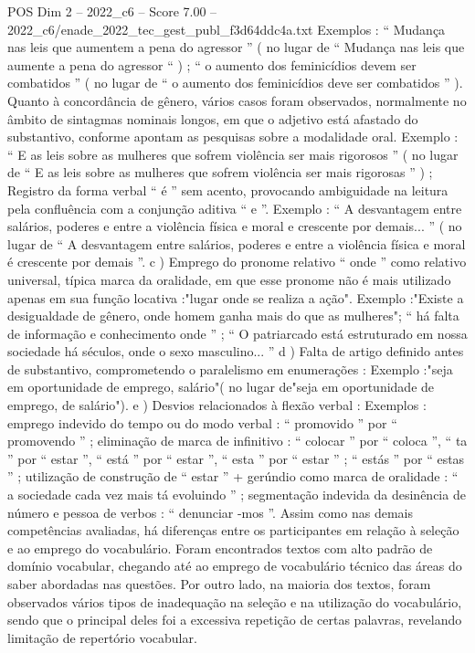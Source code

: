 \begin{textsample}{POS Dim 2 – 2022\_c6 – Score 7.00 – 2022\_c6/enade\_2022\_tec\_gest\_publ\_f3d64ddc4a.txt}
Exemplos : “ Mudança nas leis que aumentem a pena do agressor ” ( no lugar de “ Mudança nas leis que aumente a pena do agressor “ ) ; “ o aumento dos feminicídios devem ser combatidos ” ( no lugar de “ o aumento dos feminicídios deve ser combatidos ” ).
Quanto à concordância de gênero, vários casos foram observados, normalmente no âmbito de sintagmas nominais longos, em que o adjetivo está afastado do substantivo, conforme apontam as pesquisas sobre a modalidade oral.
Exemplo : “ E as leis sobre as mulheres que sofrem violência ser mais rigorosos ” ( no lugar de “ E as leis sobre as mulheres que sofrem violência ser mais rigorosas ” ) ; Registro da forma verbal “ é ” sem acento, provocando ambiguidade na leitura pela confluência com a conjunção aditiva “ e ”.
Exemplo : “ A desvantagem entre salários, poderes e entre a violência física e moral e crescente por demais... ” ( no lugar de “ A desvantagem entre salários, poderes e entre a violência física e moral é crescente por demais ”. c ) Emprego do pronome relativo “ onde ” como relativo universal, típica marca da oralidade, em que esse pronome não é mais utilizado apenas em sua função locativa :"lugar onde se realiza a ação".
Exemplo :"Existe a desigualdade de gênero, onde homem ganha mais do que as mulheres"; “ há falta de informação e conhecimento onde ” ; “ O patriarcado está estruturado em nossa sociedade há séculos, onde o sexo masculino... ” d ) Falta de artigo definido antes de substantivo, comprometendo o paralelismo em enumerações : Exemplo :"seja em oportunidade de emprego, salário"( no lugar de"seja em oportunidade de emprego, de salário"). e ) Desvios relacionados à flexão verbal : Exemplos : emprego indevido do tempo ou do modo verbal : “ promovido ” por “ promovendo ” ; eliminação de marca de infinitivo : “ colocar ” por “ coloca ”, “ ta ” por “ estar ”, “ está ” por “ estar ”, “ esta ” por “ estar ” ; “ estás ” por “ estas ” ; utilização de construção de “ estar ” + gerúndio como marca de oralidade : “ a sociedade cada vez mais tá evoluindo ” ; segmentação indevida da desinência de número e pessoa de verbos : “ denunciar -mos ”.
Assim como nas demais competências avaliadas, há diferenças entre os participantes em relação à seleção e ao emprego do vocabulário.
Foram encontrados textos com alto padrão de domínio vocabular, chegando até ao emprego de vocabulário técnico das áreas do saber abordadas nas questões.
Por outro lado, na maioria dos textos, foram observados vários tipos de inadequação na seleção e na utilização do vocabulário, sendo que o principal deles foi a excessiva repetição de certas palavras, revelando limitação de repertório vocabular.

\end{textsample}
